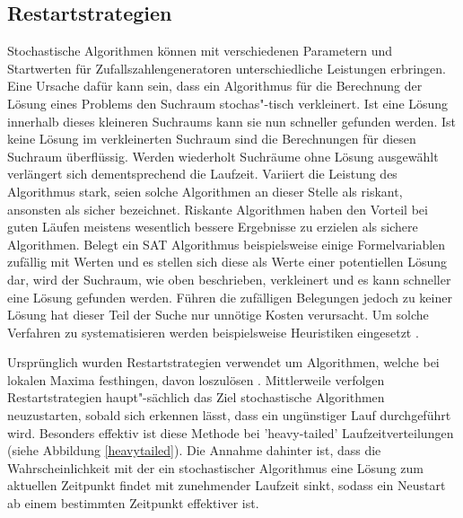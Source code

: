 \subsection{Restartstrategien}
\label{restartstrategien}

Stochastische Algorithmen können mit verschiedenen Parametern und Startwerten für Zufallszahlengeneratoren unterschiedliche Leistungen erbringen. Eine Ursache dafür kann sein, dass ein Algorithmus für die Berechnung der Lösung eines Problems den Suchraum stochas"-tisch verkleinert. Ist eine Lösung innerhalb dieses kleineren Suchraums kann sie nun schneller gefunden werden. Ist keine Lösung im verkleinerten Suchraum sind die Berechnungen für diesen Suchraum überflüssig. Werden wiederholt Suchräume ohne Lösung ausgewählt verlängert sich dementsprechend die Laufzeit. Variiert die Leistung des Algorithmus stark, seien solche Algorithmen an dieser Stelle als riskant, ansonsten als sicher bezeichnet. Riskante Algorithmen haben den Vorteil bei guten Läufen meistens wesentlich bessere Ergebnisse zu erzielen als sichere Algorithmen. Belegt ein SAT Algorithmus beispielsweise einige Formelvariablen zufällig mit Werten und es stellen sich diese als Werte einer potentiellen Lösung dar, wird der Suchraum, wie oben beschrieben, verkleinert und es kann schneller eine Lösung gefunden werden. Führen die zufälligen Belegungen jedoch zu keiner Lösung hat dieser Teil der Suche nur unnötige Kosten verursacht. Um solche Verfahren zu systematisieren werden beispielsweise Heuristiken eingesetzt \cite{brelaz79, gomesselman97}.

Ursprünglich wurden Restartstrategien verwendet um Algorithmen, welche bei lokalen Maxima festhingen, davon loszulösen \cite{kautz02}. Mittlerweile verfolgen Restartstrategien haupt"-sächlich das Ziel stochastische Algorithmen neuzustarten, sobald sich erkennen lässt, dass ein ungünstiger Lauf durchgeführt wird. Besonders effektiv ist diese Methode bei 'heavy-tailed' Laufzeitverteilungen (siehe Abbildung \ref{heavytailed}). Die Annahme dahinter ist, dass die Wahrscheinlichkeit mit der ein stochastischer Algorithmus eine Lösung zum aktuellen Zeitpunkt findet mit zunehmender Laufzeit sinkt, sodass ein Neustart ab einem bestimmten Zeitpunkt effektiver ist. \\

